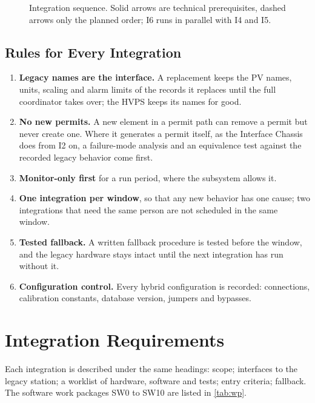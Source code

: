 \begin{figure}[tbp]
\centering
\begin{fitpicture}

\end{fitpicture}
\caption[Integration sequence.]{Integration sequence. Solid arrows are technical
prerequisites, dashed arrows only the planned order; I6 runs in parallel with I4 and
I5.}\label{fig:sequence}
\end{figure}

\subsection{Rules for Every Integration}\label{sec:rules}

\begin{enumerate}
\item \textbf{Legacy names are the interface.} A replacement keeps the PV names,
units, scaling and alarm limits of the records it replaces until the full coordinator
takes over; the HVPS keeps its names for good.
\item \textbf{No new permits.} A new element in a permit path can remove a permit but
never create one. Where it generates a permit itself, as the Interface Chassis does
from I2 on, a failure-mode analysis and an equivalence test against the recorded
legacy behavior come first.
\item \textbf{Monitor-only first} for a run period, where the subsystem allows it.
\item \textbf{One integration per window}, so that any new behavior has one cause; two
integrations that need the same person are not scheduled in the same window.
\item \textbf{Tested fallback.} A written fallback procedure is tested before the
window, and the legacy hardware stays intact until the next integration has run
without it.
\item \textbf{Configuration control.} Every hybrid configuration is recorded:
connections, calibration constants, database version, jumpers and bypasses.
\end{enumerate}

\section{Integration Requirements}\label{sec:reqs}

Each integration is described under the same headings: scope; interfaces to the legacy
station; a worklist of hardware, software and tests; entry criteria; fallback. The
software work packages SW0 to SW10 are listed in \cref{tab:wp}.

